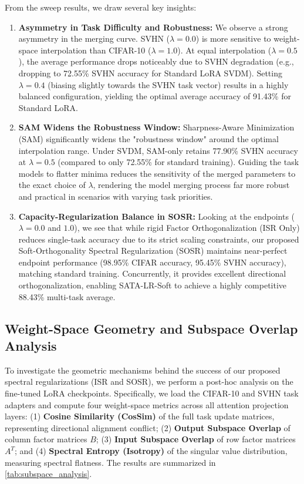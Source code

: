 \documentclass{article}
\begin{document}
From the sweep results, we draw several key insights:
\begin{enumerate}\setlength{\itemsep}{0pt}\setlength{\parsep}{0pt}
    \item \textbf{Asymmetry in Task Difficulty and Robustness:} We observe a strong asymmetry in the merging curve. SVHN ($\lambda = 0.0$) is more sensitive to weight-space interpolation than CIFAR-10 ($\lambda = 1.0$). At equal interpolation ($\lambda = 0.5$), the average performance drops noticeably due to SVHN degradation (e.g., dropping to 72.55\% SVHN accuracy for Standard LoRA SVDM). Setting $\lambda = 0.4$ (biasing slightly towards the SVHN task vector) results in a highly balanced configuration, yielding the optimal average accuracy of 91.43\% for Standard LoRA.
    \item \textbf{SAM Widens the Robustness Window:} Sharpness-Aware Minimization (SAM) significantly widens the "robustness window" around the optimal interpolation range. Under SVDM, SAM-only retains 77.90\% SVHN accuracy at $\lambda = 0.5$ (compared to only 72.55\% for standard training). Guiding the task models to flatter minima reduces the sensitivity of the merged parameters to the exact choice of $\lambda$, rendering the model merging process far more robust and practical in scenarios with varying task priorities.
    \item \textbf{Capacity-Regularization Balance in SOSR:} Looking at the endpoints ($\lambda = 0.0$ and $1.0$), we see that while rigid Factor Orthogonalization (ISR Only) reduces single-task accuracy due to its strict scaling constraints, our proposed Soft-Orthogonality Spectral Regularization (SOSR) maintains near-perfect endpoint performance (98.95\% CIFAR accuracy, 95.45\% SVHN accuracy), matching standard training. Concurrently, it provides excellent directional orthogonalization, enabling SATA-LR-Soft to achieve a highly competitive 88.43\% multi-task average.
\end{enumerate}

\subsection{Weight-Space Geometry and Subspace Overlap Analysis}
To investigate the geometric mechanisms behind the success of our proposed spectral regularizations (ISR and SOSR), we perform a post-hoc analysis on the fine-tuned LoRA checkpoints. Specifically, we load the CIFAR-10 and SVHN task adapters and compute four weight-space metrics across all attention projection layers: (1) \textbf{Cosine Similarity (CosSim)} of the full task update matrices, representing directional alignment conflict; (2) \textbf{Output Subspace Overlap} of column factor matrices $B$; (3) \textbf{Input Subspace Overlap} of row factor matrices $A^T$; and (4) \textbf{Spectral Entropy (Isotropy)} of the singular value distribution, measuring spectral flatness. The results are summarized in \cref{tab:subspace_analysis}.
\end{document}
